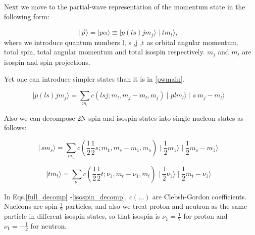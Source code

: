     Next we move to the partial-wave representation of the momentum state in the following form:

    \begin{equation}
        \mid \vec{p} \rangle = \mid p \alpha \rangle \equiv \mid p (ls) j m_j \rangle \mid t m_t \rangle,
        \label{pwmain}
    \end{equation}
    where we introduce quantum numbers l, s ,j ,t as orbital angular momentum, total spin,
    total angular momentum and total isospin respectively. $m_j$ and $m_t$ are isospin
    and spin projections.

    Yet one can introduce simpler states than it is in \ref{pwmain}.
    
    \begin{equation}
        \mid p (ls) j m_j \rangle = \sum_{m_l} c(lsj;m_l, m_j\!-\!m_l, m_j) \mid p l m_l \rangle
        \mid s~m_j\!-\!m_l \rangle
        \label{full_decomp}
    \end{equation}

    Also we can decompose 2N spin and isospin states into single nucleon states as follows:

    \begin{equation}
        \mid s m_s \rangle = \sum_{m_1} c(\frac{1}{2}\frac{1}{2}s;m_1, m_s\!-\!m_1, m_s)
        \mid \frac{1}{2} m_1 \rangle
        \mid \frac{1}{2} m_s\!-\!m_1 \rangle
        \label{spin_decomp}
    \end{equation}

    \begin{equation}
        \mid t m_t \rangle = \sum_{\nu_1} c(\frac{1}{2}\frac{1}{2}t;\nu_1, m_t\!-\!\nu_1, m_t)
        \mid \frac{1}{2} \nu_1 \rangle
        \mid \frac{1}{2} m_t\!-\!\nu_1 \rangle
        \label{isospin_decomp}
    \end{equation}

    In Eqs.\ref{full_decomp} -\ref{isospin_decomp},  $c(...)$ are Clebsh-Gordon coefficients.
    Nucleons are spin $\frac{1}{2}$ particles, and also we treat proton and neutron as 
    the same particle in different 
    isospin states, so that isospin is $\nu_1 = \frac{1}{2}$ for proton and $\nu_1 = -\frac{1}{2}$ for neutron.